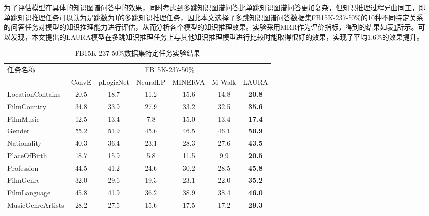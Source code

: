 \documentclass[algorithmlist, AutoFakeBold, AutoFakeSlant, figurelist, tablelist, nomlist, engineering]{seuthesix}
\begin{document}
为了评估模型在具体的知识图谱问答中的效果，同时考虑到多跳知识图谱问答比单跳知识图谱问答更加复杂，但知识推理过程异曲同工，即单跳知识推理任务可以认为是跳数为1的多跳知识推理任务，因此本文选择了多跳知识图谱问答数据集FB15K-237-50\%的10种不同特定关系的问答任务对模型的知识推理能力进行评估，从而分析各个模型的知识推理效果。实验采用MRR作为评价指标，得到的结果如表\ref{Experiment2_tasks}所示。可以发现，本文提出的LAURA模型在多跳知识推理任务上与其他知识推理模型进行比较时能取得很好的效果，实现了平均$1.6\%$的效果提升。
\begin{table}[t]
  \centering
  \caption{FB15K-237-50\%数据集特定任务实验结果}
  \begin{tabular*}{1\textwidth}{@{\extracolsep{\fill}}lcccccc}
    \toprule[1pt]
    \multirow{2}{*}{任务名称} & \multicolumn{6}{c}{FB15K-237-50\%} \\
      & ConvE & pLogicNet & NeuralLP & MINERVA & M-Walk & LAURA \\ \hline
    LocationContains & 20.5 & 18.7 & 11.2 & 15.6 & 14.8 & \textbf{20.8} \\
    FilmCountry & 34.8 & 33.9 & 27.9 & 33.2 & 32.5 & \textbf{35.6} \\
    FilmMusic & 12.5 & 13.4 & 7.8 & 15.0 & 13.4 & \textbf{17.4} \\
    Gender & 55.2 & 51.9 & 45.6 & 46.5 & 46.1 & \textbf{56.9} \\
    Nationality & 40.3 & 36.4 & 23.1 & 28.3 & 27.6 & \textbf{43.5} \\
    PlaceOfBirth & 18.7 & 15.9 & 5.8 & 11.5 & 9.9 & \textbf{20.5} \\
    Profession & 44.5 & 41.2 & 24.6 & 30.2 & 28.5 & \textbf{45.8} \\
    FilmGenre & 32.0 & 29.6 & 19.3 & 23.1 & 22.0 & \textbf{35.2} \\
    FilmLanguage & 45.8 & 41.9 & 36.2 & 38.9 & 38.4 & \textbf{46.0} \\
    MusicGenreArtists & 28.2 & 27.5 & 15.6 & 17.5 & 17.2 & \textbf{29.3} \\
    \bottomrule[1pt]
  \end{tabular*}
  \label{Experiment2_tasks}
\end{table}

\end{document}
